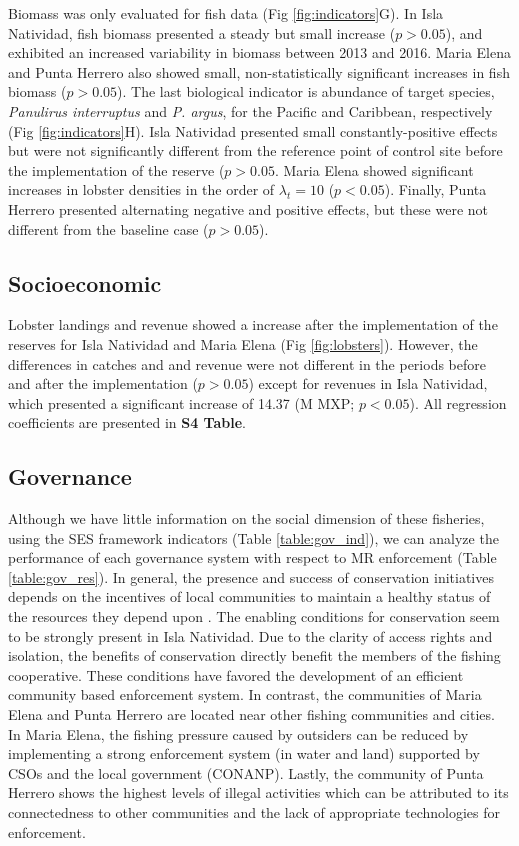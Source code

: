 \documentclass{frontiersSCNS}
\theoremstyle{definition}
\theoremstyle{definition}
\theoremstyle{definition}
\theoremstyle{remark}
\begin{document}
Biomass was only evaluated for fish data (Fig \ref{fig:indicators}G). In
Isla Natividad, fish biomass presented a steady but small increase
(\(p>0.05\)), and exhibited an increased variability in biomass between
2013 and 2016. Maria Elena and Punta Herrero also showed small,
non-statistically significant increases in fish biomass (\(p>0.05\)).
The last biological indicator is abundance of target species,
\emph{Panulirus interruptus} and \emph{P. argus}, for the Pacific and
Caribbean, respectively (Fig \ref{fig:indicators}H). Isla Natividad
presented small constantly-positive effects but were not significantly
different from the reference point of control site before the
implementation of the reserve (\(p > 0.05\). Maria Elena showed
significant increases in lobster densities in the order of
\(\lambda_t = 10\) (\(p < 0.05\)). Finally, Punta Herrero presented
alternating negative and positive effects, but these were not different
from the baseline case (\(p > 0.05\)).

\subsection{Socioeconomic}\label{socioeconomic}

Lobster landings and revenue showed a increase after the implementation
of the reserves for Isla Natividad and Maria Elena (Fig
\ref{fig:lobsters}). However, the differences in catches and and revenue
were not different in the periods before and after the implementation
(\(p > 0.05\)) except for revenues in Isla Natividad, which presented a
significant increase of 14.37 (M MXP; \(p<0.05\)). All regression
coefficients are presented in \textbf{S4 Table}.

\subsection{Governance}\label{governance}

Although we have little information on the social dimension of these
fisheries, using the SES framework indicators (Table
\ref{table:gov_ind}), we can analyze the performance of each governance
system with respect to MR enforcement (Table \ref{table:gov_res}). In
general, the presence and success of conservation initiatives depends on
the incentives of local communities to maintain a healthy status of the
resources they depend upon \citep{jupiter_2017}. The enabling conditions
for conservation seem to be strongly present in Isla Natividad. Due to
the clarity of access rights and isolation, the benefits of conservation
directly benefit the members of the fishing cooperative. These
conditions have favored the development of an efficient community based
enforcement system. In contrast, the communities of Maria Elena and
Punta Herrero are located near other fishing communities and cities. In
Maria Elena, the fishing pressure caused by outsiders can be reduced by
implementing a strong enforcement system (in water and land) supported
by CSOs and the local government (CONANP). Lastly, the community of
Punta Herrero shows the highest levels of illegal activities which can
be attributed to its connectedness to other communities and the lack of
appropriate technologies for enforcement.
\end{document}
